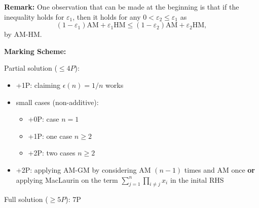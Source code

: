 \textbf{Remark:} One observation that can be made at the beginning is that if the inequality holds for $\varepsilon_1$, then it holds for any $0<\varepsilon_2\leq \varepsilon_1$ as 
\[
(1-\varepsilon_1)\text{AM}+\varepsilon_1 \text{HM}\leq (1-\varepsilon_2)\text{AM}+\varepsilon_2 \text{HM},
\]
by AM-HM.

\newpage 
\textbf{Marking Scheme:}

Partial solution ($\leq 4P$):
\begin{itemize}
\item +1P: claiming $\epsilon(n)= 1/n$ works
\item small cases (non-additive):
\begin{itemize}
    \item +0P: case $n=1$
    \item +1P: one case $n\geq 2$
    \item +2P: two cases $n\geq 2$
\end{itemize}
\item +2P: applying AM-GM by considering AM $(n-1)$ times and AM once \textbf{or} applying MacLaurin on the term $\sum_{j=1}^n \prod_{i\neq j} x_i$ in the inital RHS
\end{itemize}

Full solution ($\geq 5P$): 7P